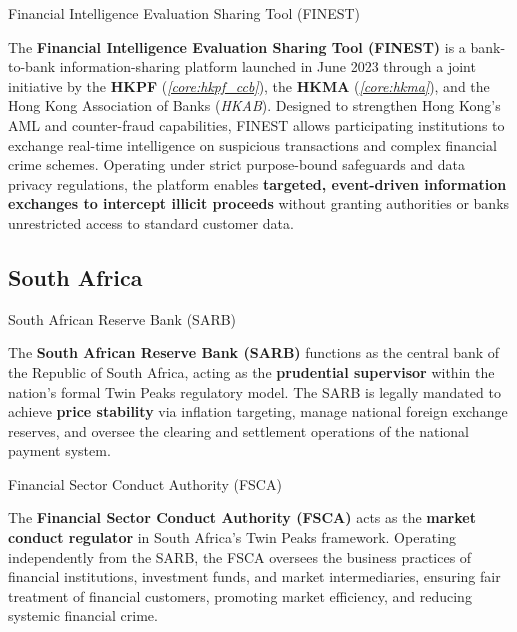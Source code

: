 \documentclass[10pt]{article}
\begin{document}
    \begin{core}{Financial Intelligence Evaluation Sharing Tool (FINEST)}

      The \textbf{Financial Intelligence Evaluation Sharing Tool (FINEST)} is a bank-to-bank information-sharing platform launched in June 2023 through a joint initiative by the \textbf{HKPF} (\textit{\autoref{core:hkpf_ccb}}), the \textbf{HKMA} (\textit{\autoref{core:hkma}}), and the Hong Kong Association of Banks (\textit{HKAB}). Designed to strengthen Hong Kong's AML and counter-fraud capabilities, FINEST allows participating institutions to exchange real-time intelligence on suspicious transactions and complex financial crime schemes. Operating under strict purpose-bound safeguards and data privacy regulations, the platform enables \textbf{targeted, event-driven information exchanges to intercept illicit proceeds} without granting authorities or banks unrestricted access to standard customer data.

    \end{core}

  \subsection{South Africa}
    \label{sec:southa}

    \begin{core}{South African Reserve Bank (SARB)}

      The \textbf{South African Reserve Bank (SARB)} functions as the central bank of the Republic of South Africa, acting as the \textbf{prudential supervisor} within the nation’s formal Twin Peaks regulatory model. The SARB is legally mandated to achieve \textbf{price stability} via inflation targeting, manage national foreign exchange reserves, and oversee the clearing and settlement operations of the national payment system.

    \end{core}

    \begin{core}{Financial Sector Conduct Authority (FSCA)}

      The \textbf{Financial Sector Conduct Authority (FSCA)} acts as the \textbf{market conduct regulator} in South Africa’s Twin Peaks framework. Operating independently from the SARB, the FSCA oversees the business practices of financial institutions, investment funds, and market intermediaries, ensuring fair treatment of financial customers, promoting market efficiency, and reducing systemic financial crime.

    \end{core}
\end{document}
